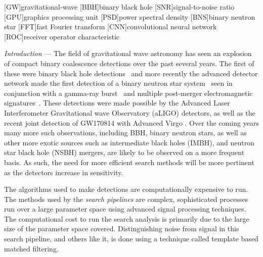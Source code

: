 \documentclass[%
showpacs,
 amsmath,amssymb,
 aps,
 twocolumn,
 prl,
 reprint,
floatfix,
]{revtex4-1}
\begin{document}
\maketitle

[GW]{gravitational-wave}
[BBH]{binary black hole}
[SNR]{signal-to-noise ratio}
[GPU]{graphics processing unit}
[PSD]{power spectral density}
[BNS]{binary neutron star}
[FFT]{fast Fourier transform}
[CNN]{convolutional neural network}
[ROC]{receiver operator characteristic}


%
%

%
%
\textit{Introduction} --- 
%
%
The field of gravitational wave astronomy has seen an explosion of compact
binary coalescence detections over the past several years. The first of these
were binary black hole detections~\cite{PhysRevLett.116.061102,
PhysRevLett.116.241103, PhysRevLett.118.221101} and more recently the advanced
detector network made the first detection of a binary neutron star
system~\cite{PhysRevLett.119.161101} seen in conjunction with a gamma-ray
burst~\cite{2017arXiv171005834L,2017arXiv171005446G,2017arXiv171005449S} and
multiple post-merger electromagnetic signatures~\cite{2017arXiv171005833L}.
These detections were made possible by the Advanced Laser Interferometer
Gravitational wave Observatory (aLIGO) detectors, as well as the recent joint
detection of GW170814 with Advanced Virgo \cite{PhysRevLett.119.141101}. Over
the coming years many more such observations, including \ac{BBH}, binary
neutron stars, as well as other more exotic sources such as intermediate black
holes (IMBH), and neutron star black hole (NSBH) mergers, are likely to be
observed on a more frequent basis. As such, the need for more efficient search
methods will be more pertinent as the detectors increase in sensitivity.

%
%
The algorithms used to make detections \cite{0264-9381-33-21-215004, 0004-637X-748-2-136, PhysRevD.90.082004} are computationally expensive to run. The methods used by the \textit{search pipelines} are complex, sophisticated processes run over a large parameter space using advanced signal processing techniques. The computational cost to run the search analysis is primarily due to the large size of the parameter space covered. Distinguishing noise from signal in this search pipeline, and others like it, is done using a technique called template based matched filtering. 
\end{document}
